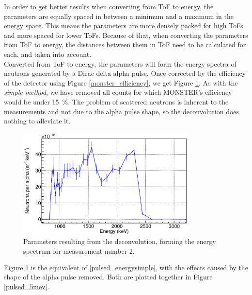 \documentclass[a4paper,12pt]{report}
\begin{document}
In order to get better results when converting from ToF to energy, the parameters are equally spaced in between a minimum and a maximum in the energy space.
This means the parameters are more densely packed for high ToFs and more spaced for lower ToFs.
Because of that, when converting the parameters from ToF to energy, the distances between them in ToF need to be calculated for each, and taken into account.
\\

Converted from ToF to energy, the parameters will form the energy spectra of neutrons generated by a Dirac delta alpha pulse.
Once corrected by the efficiency of the detector using Figure \ref{monster_efficiency}, we get Figure \ref{pulsed_deconvolution}.
As with the \textit{simple method}, we have removed all counts for which MONSTER's efficiency would be under \qty{15}{\percent}.
The problem of scattered neutrons is inherent to the measurements and not due to the alpha pulse shape, so the deconvolution does nothing to alleviate it.

\begin{figure}[H]
	\centering
	\includegraphics[width=0.80\textwidth]{pulsed_deconvolution.eps}
	\caption{Parameters resulting from the deconvolution, forming the energy spectrum for measurement number 2.}
	\label{pulsed_deconvolution}
\end{figure}

Figure \ref{pulsed_deconvolution} is the equivalent of \ref{pulsed_energysimple}, with the effects caused by the shape of the alpha pulse removed.
Both are plotted together in Figure \ref{pulsed_5mev}.
\end{document}
